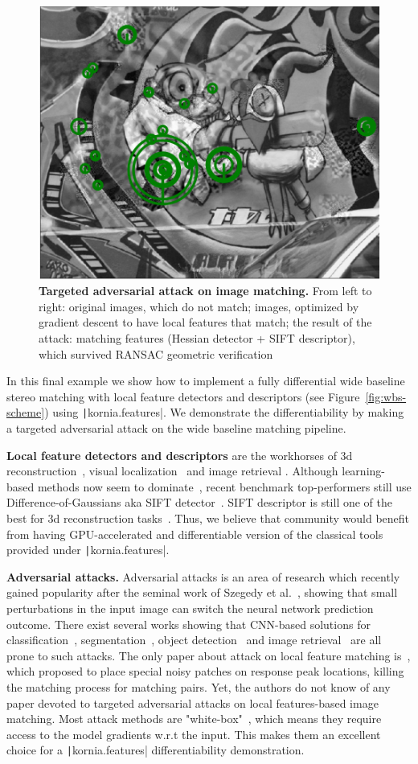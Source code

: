 \begin{figure}[tb]
\begin{center}
        \includegraphics[width=0.32\linewidth]{main/chapter03/data/wbs/0_inl.jpg} 
    \end{center}
    \caption{{\bf Targeted adversarial attack on image matching.} From left to right: original images, which do not match; images, optimized by gradient descent to have local features that match; the result of the attack: matching features (Hessian detector + SIFT descriptor), which survived RANSAC geometric verification}
    \label{fig:wbs}
\end{figure}
In this final  example we show how to implement a  fully differential wide baseline stereo matching with local feature detectors and descriptors (see Figure~\ref{fig:wbs-scheme}) using \texttt|kornia.features|. We demonstrate the differentiability by making a targeted adversarial attack on the wide baseline matching pipeline.

\textbf{Local feature detectors and descriptors} are the workhorses of 3d reconstruction~\citep{schonberger2016structure, torii2018structure}, visual localization~\citep{sarlin2019coarse} and image retrieval \citep{shen2018matchable}. Although learning-based methods now seem to dominate~\citep{LocaFeaturesReview2018}, recent benchmark top-performers still use Difference-of-Gaussians aka SIFT detector~\citep{CVPRW2019}. SIFT descriptor is still one of the best for 3d reconstruction tasks~\citep{ColmapBenchmark2017}. Thus, we believe that community would benefit from having GPU-accelerated and differentiable version of the classical tools provided under \texttt|kornia.features|.

\textbf{Adversarial attacks.}
Adversarial attacks is an area of research which recently gained popularity after the seminal work of Szegedy et al.~\citep{AdvAttack2014}, showing that small perturbations in the input image can switch the neural network prediction outcome. There exist several  works showing that CNN-based solutions for classification~\citep{NIPS2018Adv}, segmentation~\citep{arnab_cvpr_2018}, object detection~\citep{ObjDetAdv2018} and image retrieval~\citep{AdvRetrieval2019}   are all prone to such attacks. 
The only paper about attack on local feature matching is~\citep{adversarial_attack_local_features2019l}, which proposed to place special noisy patches on response peak locations, killing the matching process for matching pairs. Yet, the authors do not know of any paper devoted to targeted adversarial attacks on local features-based image matching. 
Most attack methods are "white-box"~\citep{NIPS2018Adv}, which means they require access to the model gradients w.r.t the input. This makes them an excellent choice for a \texttt|kornia.features| differentiability demonstration.

